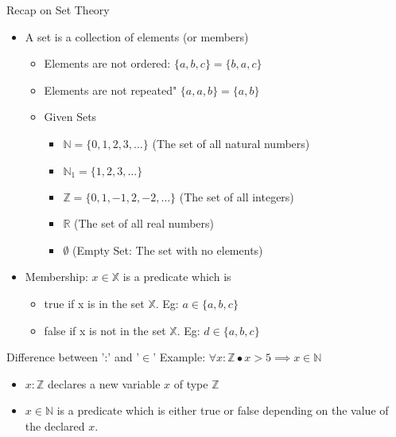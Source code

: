 \documentclass[aspectratio=169]{beamer}
\begin{document}
\begin{frame}{Recap on Set Theory}
    \begin{itemize}
        \item A set is a collection of elements (or members)
        \begin{itemize}
            \item Elements are not ordered: $\{a, b, c\} = \{b, a, c\}$
            \item Elements are not repeated" $\{a, a, b\}= \{a, b\}$
            \item Given Sets
            \begin{itemize}
                \item $\mathbb{N} = \{0, 1, 2, 3, \ldots \}$ (The set of all natural numbers)
                \item $\mathbb{N}_{1} = \{1, 2, 3, \ldots \}$
                \item $\mathbb{Z} = \{0, 1, -1, 2, -2, \ldots \}$ (The set of all integers)
                \item $\mathbb{R}$ (The set of all real numbers)
                \item $\emptyset$ (Empty Set: The set with no elements)
            \end{itemize}
        \end{itemize}
        \item Membership: $x \in \mathbb{X}$ is a predicate which is
        \begin{itemize}
            \item true if x is in the set $\mathbb{X}$. Eg: $a \in \{a, b, c\}$
            \item false if x is not in the set $\mathbb{X}$. Eg: $d \in \{a, b, c\}$
        \end{itemize}
    \end{itemize}

    \begin{block}{Difference between ':' and '$\in$'}
        Example: $\forall x : \mathbb{Z} \bullet x > 5 \implies x \in \mathbb{N}$
        \begin{itemize}
            \item $x : \mathbb{Z}$ declares a new variable $x$ of type $\mathbb{Z}$
            \item $x \in \mathbb{N}$ is a predicate which is either true or false depending on the value of the declared $x$.
        \end{itemize}
    \end{block}
\end{frame}
\end{document}
